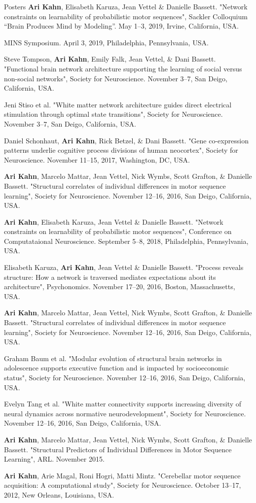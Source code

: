 \documentclass{resume} %
\begin{document}
\begin{rSection}{Posters}
\textbf{Ari Kahn}, Elisabeth Karuza, Jean Vettel \& Danielle Bassett. "Network constraints on learnability of probabilistic motor sequences", Sackler Colloquium ``Brain Produces Mind by Modeling''. May 1--3, 2019, Irvine, California, USA.

MINS Symposium. April 3, 2019, Philadelphia, Pennsylvania, USA.

Steve Tompson, \textbf{Ari Kahn}, Emily Falk, Jean Vettel, \& Dani Bassett. "Functional brain network architecture supporting the learning of social versus non-social networks", Society for Neuroscience. November 3--7, San Deigo, California, USA.

Jeni Stiso et al. "White matter network architecture guides direct electrical stimulation through optimal state transitions", Society for Neuroscience. November 3--7, San Deigo, California, USA.

Daniel Schonhaut, \textbf{Ari Kahn}, Rick Betzel, \& Dani Bassett. "Gene co-expression patterns underlie cognitive process divisions of human neocortex", Society for Neuroscience. November 11--15, 2017, Washington, DC, USA.

\textbf{Ari Kahn}, Marcelo Mattar, Jean Vettel, Nick Wymbs, Scott Grafton, \& Danielle Bassett. "Structural correlates of individual differences in motor sequence learning", Society for Neuroscience. November 12--16, 2016, San Deigo, California, USA.

\textbf{Ari Kahn}, Elisabeth Karuza, Jean Vettel \& Danielle Bassett. "Network constraints on learnability of probabilistic motor sequences", Conference on Computataional Neuroscience. September 5--8, 2018, Philadelphia, Pennsylvania, USA.

Elisabeth Karuza, \textbf{Ari Kahn}, Jean Vettel \& Danielle Bassett. "Process reveals structure: How a network is traversed mediates expectations about its architecture", Psychonomics. November 17--20, 2016, Boston, Massachusetts, USA.

\textbf{Ari Kahn}, Marcelo Mattar, Jean Vettel, Nick Wymbs, Scott Grafton, \& Danielle Bassett. "Structural correlates of individual differences in motor sequence learning", Society for Neuroscience. November 12--16, 2016, San Deigo, California, USA.

Graham Baum et al. "Modular evolution of structural brain networks in adolescence supports executive function and is impacted by socioeconomic status", Society for Neuroscience. November 12--16, 2016, San Deigo, California, USA.

Evelyn Tang et al. "White matter connectivity supports increasing diversity of neural dynamics across normative neurodevelopment", Society for Neuroscience. November 12--16, 2016, San Deigo, California, USA.

\textbf{Ari Kahn}, Marcelo Mattar, Jean Vettel, Nick Wymbs, Scott Grafton, \& Danielle Bassett. "Structural Predictors of Individual Differences in Motor Sequence Learning", ARL. November 2015.

\textbf{Ari Kahn}, Arie Magal, Roni Hogri, Matti Mintz. "Cerebellar motor sequence acquisition: A computational study", Society for Neuroscience. October 13--17, 2012, New Orleans, Louisiana, USA.
\end{rSection}
\end{document}
